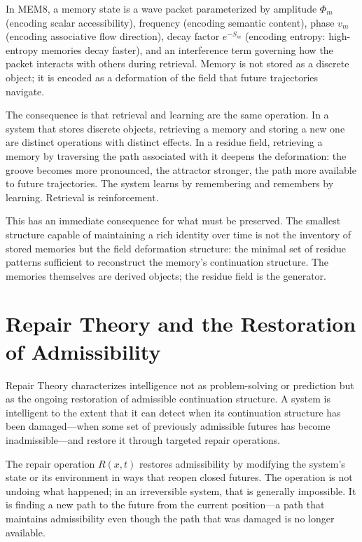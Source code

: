 \documentclass[12pt, oneside]{book}
\theoremstyle{flyxion}
\theoremstyle{definition}
\begin{document}
In MEM\textbar{}8, a memory state is a wave packet parameterized by
amplitude $\Phi_m$ (encoding scalar accessibility), frequency
(encoding semantic content), phase $v_m$ (encoding associative flow
direction), decay factor $e^{-S_m}$ (encoding entropy: high-entropy
memories decay faster), and an interference term governing how the
packet interacts with others during retrieval. Memory is not stored
as a discrete object; it is encoded as a deformation of the field
that future trajectories navigate.

The consequence is that retrieval and learning are the same
operation. In a system that stores discrete objects, retrieving
a memory and storing a new one are distinct operations with distinct
effects. In a residue field, retrieving a memory by traversing the
path associated with it deepens the deformation: the groove becomes
more pronounced, the attractor stronger, the path more available
to future trajectories. The system learns by remembering and
remembers by learning. Retrieval is reinforcement.

This has an immediate consequence for what must be preserved. The
smallest structure capable of maintaining a rich identity over time
is not the inventory of stored memories but the field deformation
structure: the minimal set of residue patterns sufficient to
reconstruct the memory's continuation structure. The memories
themselves are derived objects; the residue field is the generator.

\section{Repair Theory and the Restoration of Admissibility}

Repair Theory characterizes intelligence not as problem-solving or
prediction but as the ongoing restoration of admissible continuation
structure. A system is intelligent to the extent that it can detect
when its continuation structure has been damaged---when some set of
previously admissible futures has become inadmissible---and restore
it through targeted repair operations.

The repair operation $R(x, t)$ restores admissibility by modifying
the system's state or its environment in ways that reopen closed
futures. The operation is not undoing what happened; in an
irreversible system, that is generally impossible. It is finding
a new path to the future from the current position---a path that
maintains admissibility even though the path that was damaged is
no longer available.
\end{document}
